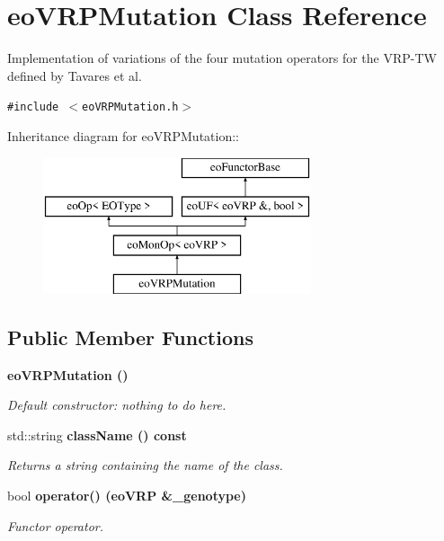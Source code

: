 \section{eo\-VRPMutation Class Reference}
\label{classeo_v_r_p_mutation}
Implementation of variations of the four mutation operators for the VRP-TW defined by Tavares et al.  


{\tt \#include $<$eo\-VRPMutation.h$>$}

Inheritance diagram for eo\-VRPMutation::\begin{figure}[H]
\begin{center}
\leavevmode
\includegraphics[height=4cm]{classeo_v_r_p_mutation}
\end{center}
\end{figure}
\subsection*{Public Member Functions}
\begin{CompactItemize}
\item 
\bf{eo\-VRPMutation} ()\label{classeo_v_r_p_mutation_419ac5c738369876de09212a844e67c3}

\begin{CompactList}\small\item\em Default constructor: nothing to do here. \item\end{CompactList}\item 
std::string \bf{class\-Name} () const 
\begin{CompactList}\small\item\em Returns a string containing the name of the class. \item\end{CompactList}\item 
bool \bf{operator()} (\bf{eo\-VRP} \&\_\-genotype)
\begin{CompactList}\small\item\em Functor operator. \item\end{CompactList}\end{CompactItemize}
